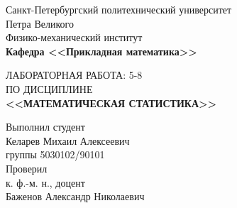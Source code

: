 \documentclass[main.tex]{subfiles}
\begin{document}
\begin{titlepage}
\begin{center}
	\begin{large}
		Санкт-Петербургский политехнический университет\\ Петра Великого\\		
		\vspace{\baselineskip}
		Физико-механический институт\\
		\textbf{Кафедра <<Прикладная математика>>}\\
	\end{large}
	\vfill
	\Large{{ЛАБОРАТОРНАЯ РАБОТА: 5-8
	\\ {ПО ДИСЦИПЛИНЕ} \\\textbf{<<МАТЕМАТИЧЕСКАЯ СТАТИСТИКА>>}}}
\end{center}
\vfill
\begin{flushright}	
	Выполнил студент\\
	Келарев Михаил Алексеевич\\
	группы 5030102/90101\\
	\vspace{\baselineskip}	
	Проверил\\
	к. ф.-м. н., доцент\\
	Баженов Александр Николаевич
\end{flushright}
\vfill
{}
\end{titlepage}
\end{document}
